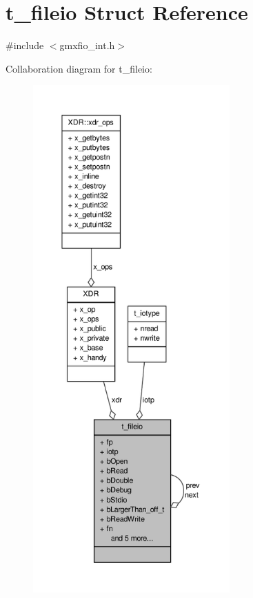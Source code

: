 \hypertarget{structt__fileio}{\section{t\-\_\-fileio \-Struct \-Reference}
\label{structt__fileio}
}


{\ttfamily \#include $<$gmxfio\-\_\-int.\-h$>$}



\-Collaboration diagram for t\-\_\-fileio\-:
\nopagebreak
\begin{figure}[H]
\begin{center}
\leavevmode
\includegraphics[height=550pt]{structt__fileio__coll__graph}
\end{center}
\end{figure}
